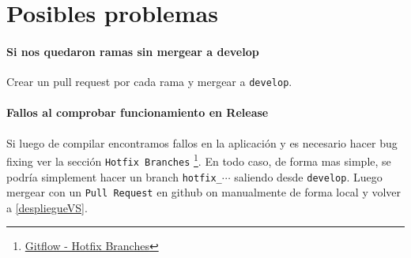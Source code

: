 \documentclass[12pt,a4paper]{article}
\begin{document}
\section{Posibles problemas}

\paragraph{Si nos quedaron ramas sin mergear a develop}
Crear un pull request por cada rama y mergear a \texttt{develop}.

\paragraph{Fallos al comprobar funcionamiento en Release}
Si luego de compilar encontramos fallos en la aplicación y es necesario hacer bug fixing ver la sección \texttt{Hotfix Branches} \footnote{\href{https://www.atlassian.com/git/tutorials/comparing-workflows/gitflow-workflow}{Gitflow - Hotfix Branches}}. En todo caso, de forma mas simple, se podría simplement hacer un branch \texttt{hotfix\_$\cdots$} saliendo desde \texttt{develop}. Luego mergear con un \texttt{Pull Request} en github on manualmente de forma local y volver a \autoref{despliegueVS}.
\end{document}
